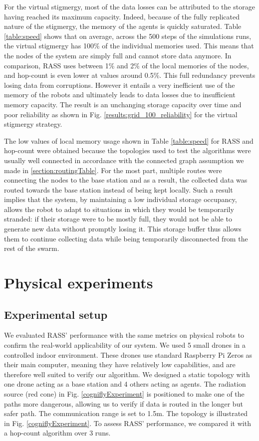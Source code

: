 \documentclass[letterpaper, 10 pt, conference]{ieeeconf}
\begin{document}
For the virtual stigmergy, most of the data losses can be attributed to the storage having reached its maximum capacity. Indeed, because of the fully replicated nature of the stigmergy, the memory of the agents is quickly saturated. Table \ref{table:speed} shows that on average, across the 500 steps of the simulations runs, the virtual stigmergy has 100\% of the individual memories used. This means that the nodes of the system are simply full and cannot store data anymore. In comparison, RASS uses between 1\% and 2\% of the local memories of the nodes, and hop-count is even lower at values around 0.5\%. This full redundancy prevents losing data from corruptions. However it entails a very inefficient use of the memory of the robots and ultimately leads to data losses due to insufficient memory capacity. The result is an unchanging storage capacity over time and poor reliability as shown in Fig. \ref{results:grid_100_reliability} for the virtual stigmergy strategy.

The low values of local memory usage shown in Table \ref{table:speed} for RASS and hop-count were obtained because the topologies used to test the algorithms were usually well connected in accordance with the connected graph assumption we made in \ref{section:routingTable}. For the most part, multiple routes were connecting the nodes to the base station and as a result, the collected data was routed towards the base station instead of being kept locally. Such a result implies that the system, by maintaining a low individual storage occupancy, allows the robot to adapt to situations in which they would be temporarily stranded: if their storage were to be mostly full, they would not be able to generate new data without promptly losing it. This storage buffer thus allows them to continue collecting data while being temporarily disconnected from the rest of the swarm.

\section{Physical experiments}
\label{Physical experiments}

\subsection{Experimental setup}
We evaluated RASS' performance with the same
metrics on physical robots to confirm the real-world applicability of our system. We used 5 small drones in a controlled indoor environment. These drones use standard Raspberry Pi Zeros as their main computer, meaning they have relatively low capabilities, and are therefore well suited to verify our algorithm. We designed a static topology with one drone acting as a base station and 4 others acting as agents. The radiation source (red cone) in Fig. \ref{cogniflyExperiment} is positioned to make one of the paths more dangerous, allowing us to verify if data is routed in the longer but safer path. The communication range is set to 1.5m. The topology is illustrated in Fig. \ref{cogniflyExperiment}. To assess RASS' performance, we compared it with a hop-count algorithm over 3 runs.
\end{document}
